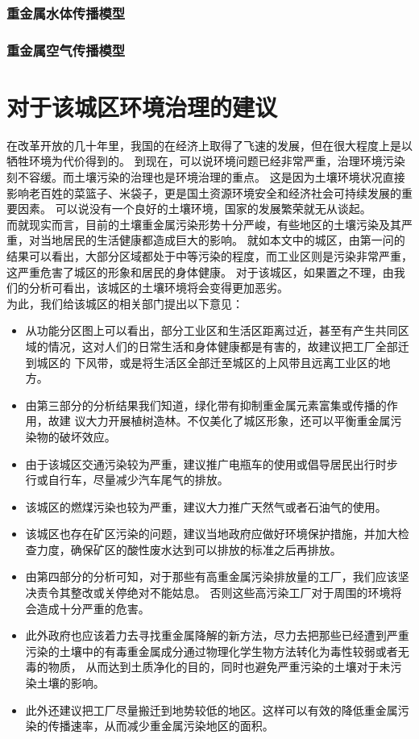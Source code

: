 \documentclass[a4paper]{article}
\begin{document}
\section{重金属水体传播模型}
\section{重金属空气传播模型}



\part{对于该城区环境治理的建议}
在改革开放的几十年里，我国的在经济上取得了飞速的发展，但在很大程度上是以牺牲环境为代价得到的。
到现在，可以说环境问题已经非常严重，治理环境污染刻不容缓。而土壤污染的治理也是环境治理的重点。
这是因为土壤环境状况直接影响老百姓的菜篮子、米袋子，更是国土资源环境安全和经济社会可持续发展的重要因素。
可以说没有一个良好的土壤环境，国家的发展繁荣就无从谈起。  \\
\indent 而就现实而言，目前的土壤重金属污染形势十分严峻，有些地区的土壤污染及其严重，对当地居民的生活健康都造成巨大的影响。
就如本文中的城区，由第一问的结果可以看出，大部分区域都处于中等污染的程度，而工业区则是污染非常严重，这严重危害了城区的形象和居民的身体健康。
对于该城区，如果置之不理，由我们的分析可看出，该城区的土壤环境将会变得更加恶劣。  \\
\indent 为此，我们给该城区的相关部门提出以下意见：
\begin{itemize}
\item 从功能分区图上可以看出，部分工业区和生活区距离过近，甚至有产生共同区
域的情况，这对人们的日常生活和身体健康都是有害的，故建议把工厂全部迁到城区的
下风带，或是将生活区全部迁至城区的上风带且远离工业区的地方。
\item 由第三部分的分析结果我们知道，绿化带有抑制重金属元素富集或传播的作用，故建
议大力开展植树造林。不仅美化了城区形象，还可以平衡重金属污染物的破坏效应。
\item 由于该城区交通污染较为严重，建议推广电瓶车的使用或倡导居民出行时步
行或自行车，尽量减少汽车尾气的排放。
\item 该城区的燃煤污染也较为严重，建议大力推广天然气或者石油气的使用。
\item 该城区也存在矿区污染的问题，建议当地政府应做好环境保护措施，并加大检
查力度，确保矿区的酸性废水达到可以排放的标准之后再排放。
\item 由第四部分的分析可知，对于那些有高重金属污染排放量的工厂，我们应该坚决责令其整改或关停绝对不能姑息。
否则这些高污染工厂对于周围的环境将会造成十分严重的危害。
\item 此外政府也应该着力去寻找重金属降解的新方法，尽力去把那些已经遭到严重污染的土壤中的有毒重金属成分通过物理化学生物方法转化为毒性较弱或者无毒的物质，
从而达到土质净化的目的，同时也避免严重污染的土壤对于未污染土壤的影响。
\item 此外还建议把工厂尽量搬迁到地势较低的地区。这样可以有效的降低重金属污染的传播速率，从而减少重金属污染地区的面积。
\end{itemize}
\end{document}
